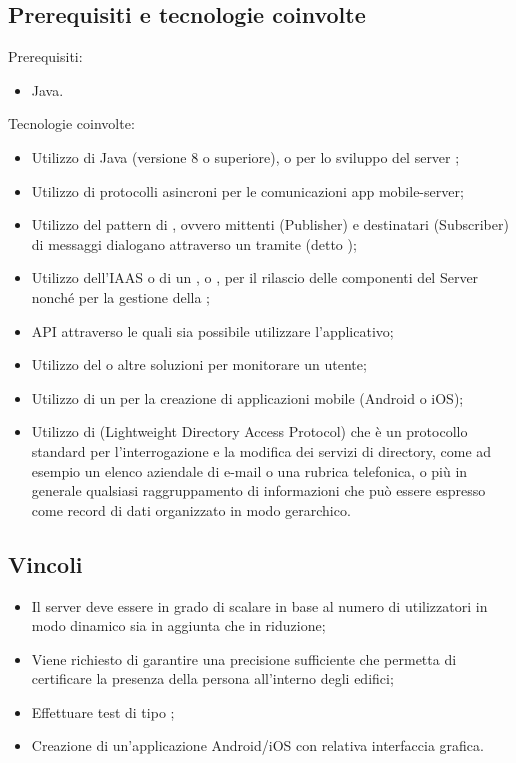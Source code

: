 \subsection{Prerequisiti e tecnologie coinvolte}
Prerequisiti:
\begin{itemize}
\item Java.
\end{itemize}
Tecnologie coinvolte:
\begin{itemize}
\item Utilizzo di Java (versione 8 o superiore),  o  per lo sviluppo del server ;
\item Utilizzo di protocolli asincroni per le comunicazioni app mobile-server;
\item Utilizzo del pattern di , ovvero mittenti (Publisher) e destinatari (Subscriber) di messaggi dialogano attraverso un tramite (detto );
\item Utilizzo dell'IAAS  o di un ,  o , per il rilascio delle componenti del Server nonché per la gestione della ;
\item API  attraverso le quali sia possibile utilizzare l'applicativo;
\item Utilizzo del  o altre soluzioni per monitorare un utente;
\item Utilizzo di un  per la creazione di applicazioni mobile (Android o iOS);
\item Utilizzo di  (Lightweight Directory Access Protocol) che \`e un protocollo standard per l'interrogazione e la modifica dei servizi di directory, come ad esempio un elenco aziendale di e-mail o una rubrica telefonica, o più in generale qualsiasi raggruppamento di informazioni che può essere espresso come record di dati organizzato in modo gerarchico.
\end{itemize}

\subsection{Vincoli}
\begin{itemize}
\item Il server deve essere in grado di scalare in base al numero di utilizzatori in modo dinamico sia in aggiunta che in riduzione;
\item Viene richiesto di garantire una precisione sufficiente che permetta di certificare la presenza della persona all'interno degli edifici;
\item Effettuare test di tipo ;
\item Creazione di un'applicazione Android/iOS con relativa interfaccia grafica.
\end{itemize}

